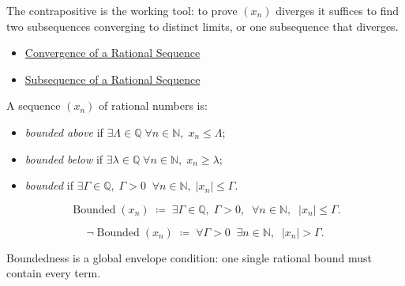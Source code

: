 \begin{remark*}[Interpretation]
The contrapositive is the working tool: to prove $(x_n)$ diverges it suffices
to find two subsequences converging to distinct limits, or one subsequence
that diverges.
\end{remark*}

\begin{dependencies}
\begin{itemize}
  \item \hyperref[def:convergent-rational-sequence]{Convergence of a Rational Sequence}
  \item \hyperref[def:subsequence-q]{Subsequence of a Rational Sequence}
\end{itemize}
\end{dependencies}

\begin{definition}
\label{def:bounded-sequence-q}
A sequence $(x_n)$ of rational numbers is:
\begin{itemize}
  \item \emph{bounded above} if $\exists \Lambda \in \mathbb{Q}\; \forall n \in \mathbb{N},\;
        x_n \leq \Lambda$;
  \item \emph{bounded below} if $\exists \lambda \in \mathbb{Q}\; \forall n \in \mathbb{N},\;
        x_n \geq \lambda$;
  \item \emph{bounded} if $\exists \Gamma \in \mathbb{Q},\;\Gamma>0\;\;
        \forall n \in \mathbb{N},\; |x_n| \leq \Gamma$.
\end{itemize}
\end{definition}

\begin{remark*}
\[
\operatorname{Bounded}(x_n)
\;\coloneqq\;
\exists \Gamma \in \mathbb{Q},\; \Gamma > 0,\;\;
\forall n \in \mathbb{N},\;\; |x_n| \leq \Gamma.
\]
\end{remark*}

\begin{remark*}
\[
\neg\operatorname{Bounded}(x_n)
\;\coloneqq\;
\forall \Gamma > 0 \;\; \exists n \in \mathbb{N},\;\; |x_n| > \Gamma.
\]
\end{remark*}

\begin{remark*}[Interpretation]
Boundedness is a global envelope condition: one single rational bound must
contain every term.
\end{remark*}

